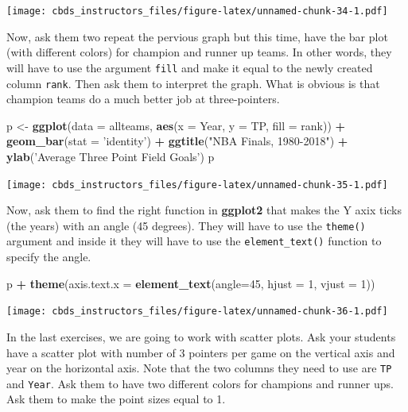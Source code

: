 \documentclass[]{book}
\newenvironment{Shaded}{\begin{snugshade}}{\end{snugshade}}
\newcommand{\DataTypeTok}[1]{\textcolor[rgb]{0.13,0.29,0.53}{#1}}
\newcommand{\DecValTok}[1]{\textcolor[rgb]{0.00,0.00,0.81}{#1}}
\newcommand{\KeywordTok}[1]{\textcolor[rgb]{0.13,0.29,0.53}{\textbf{#1}}}
\newcommand{\NormalTok}[1]{#1}
\newcommand{\OperatorTok}[1]{\textcolor[rgb]{0.81,0.36,0.00}{\textbf{#1}}}
\newcommand{\StringTok}[1]{\textcolor[rgb]{0.31,0.60,0.02}{#1}}
\begin{document}
\texttt{[image: cbds\_instructors\_files/figure-latex/unnamed-chunk-34-1.pdf]}

Now, ask them two repeat the pervious graph but this time, have the bar plot (with different colors) for champion and runner up teams. In other words, they will have to use the argument \texttt{fill} and make it equal to the newly created column \texttt{rank}. Then ask them to interpret the graph. What is obvious is that champion teams do a much better job at three-pointers.

\begin{Shaded}
\begin{Highlighting}[]
\NormalTok{p <-}\StringTok{ }\KeywordTok{ggplot}\NormalTok{(}\DataTypeTok{data =}\NormalTok{ allteams, }\KeywordTok{aes}\NormalTok{(}\DataTypeTok{x =}\NormalTok{ Year, }\DataTypeTok{y =}\NormalTok{ TP, }\DataTypeTok{fill =}\NormalTok{ rank)) }\OperatorTok{+}\StringTok{ }
\StringTok{    }\KeywordTok{geom_bar}\NormalTok{(}\DataTypeTok{stat =} \StringTok{'identity'}\NormalTok{) }\OperatorTok{+}
\StringTok{    }\KeywordTok{ggtitle}\NormalTok{(}\StringTok{"NBA Finals, 1980-2018"}\NormalTok{) }\OperatorTok{+}
\StringTok{    }\KeywordTok{ylab}\NormalTok{(}\StringTok{'Average Three Point Field Goals'}\NormalTok{)}
\NormalTok{p}
\end{Highlighting}
\end{Shaded}

\texttt{[image: cbds\_instructors\_files/figure-latex/unnamed-chunk-35-1.pdf]}

Now, ask them to find the right function in \textbf{ggplot2} that makes the Y axix ticks (the years) with an angle (45 degrees). They will have to use the \texttt{theme()} argument and inside it they will have to use the \texttt{element\_text()} function to specify the angle.

\begin{Shaded}
\begin{Highlighting}[]
\NormalTok{p }\OperatorTok{+}\StringTok{ }\KeywordTok{theme}\NormalTok{(}\DataTypeTok{axis.text.x =} \KeywordTok{element_text}\NormalTok{(}\DataTypeTok{angle=}\DecValTok{45}\NormalTok{, }\DataTypeTok{hjust =} \DecValTok{1}\NormalTok{, }\DataTypeTok{vjust =} \DecValTok{1}\NormalTok{))}
\end{Highlighting}
\end{Shaded}

\texttt{[image: cbds\_instructors\_files/figure-latex/unnamed-chunk-36-1.pdf]}

In the last exercises, we are going to work with scatter plots. Ask your students have a scatter plot with number of 3 pointers per game on the vertical axis and year on the horizontal axis. Note that the two columns they need to use are \texttt{TP} and \texttt{Year}. Ask them to have two different colors for champions and runner ups. Ask them to make the point sizes equal to 1.
\end{document}
